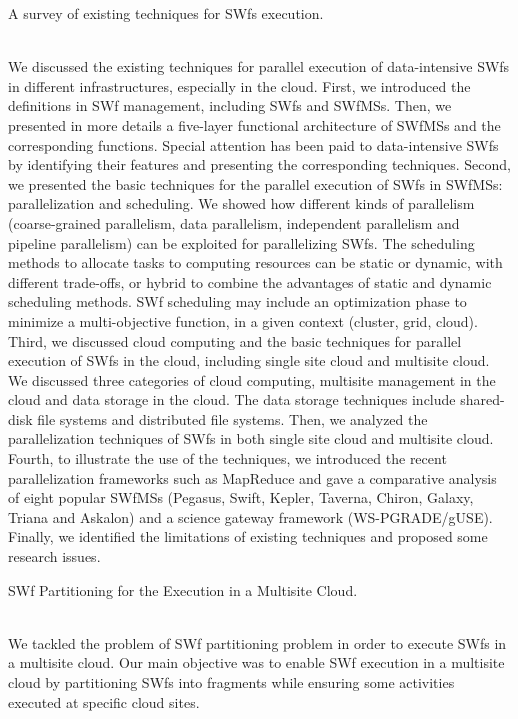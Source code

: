 \begin{bf}A survey of existing techniques for SWfs execution.\end{bf} 
\\[6pt]
\noindent We discussed the existing techniques for parallel execution of data-intensive SWfs in different infrastructures, especially in the cloud. 
First, we introduced the definitions in SWf management, including SWfs and SWfMSs. Then, we presented in more details a five-layer functional architecture of SWfMSs and the corresponding functions. Special attention has been paid to data-intensive SWfs by identifying their features and presenting the corresponding techniques.
Second, we presented the basic techniques for the parallel execution of SWfs in SWfMSs: parallelization and scheduling. 
We showed how different kinds of parallelism (coarse-grained parallelism, data parallelism, independent parallelism and pipeline parallelism) can be exploited for
parallelizing SWfs. The scheduling methods to allocate tasks to computing resources can be static or dynamic, with
different trade-offs, or hybrid to combine the advantages of static and dynamic scheduling methods.
SWf scheduling may include an optimization phase to minimize a multi-objective function, in a given context (cluster, grid, cloud).
Third, we discussed cloud computing and the basic techniques for parallel execution of SWfs in the cloud, 
including single site cloud and multisite cloud. We discussed three categories of cloud computing, multisite management in the cloud and data storage in the cloud. The data storage techniques include shared-disk file systems and distributed file systems. Then, we analyzed the parallelization techniques of SWfs in both single site cloud and multisite cloud. 
Fourth, to illustrate the use of the techniques, we introduced the recent parallelization frameworks such as MapReduce and gave a comparative analysis of eight popular SWfMSs (Pegasus, Swift, Kepler, Taverna, Chiron, Galaxy, Triana and Askalon) and a science gateway framework (WS-PGRADE/gUSE).
Finally, we identified the limitations of existing techniques and proposed some research issues.
\\[12pt]
\noindent \begin{bf}SWf Partitioning for the Execution in a Multisite Cloud.\end{bf} 
\\[6pt]
\noindent We tackled the problem of SWf partitioning problem in order to execute SWfs in a multisite cloud. Our main objective was to enable SWf execution in a multisite cloud by partitioning SWfs into fragments while ensuring some activities executed at specific cloud sites.
